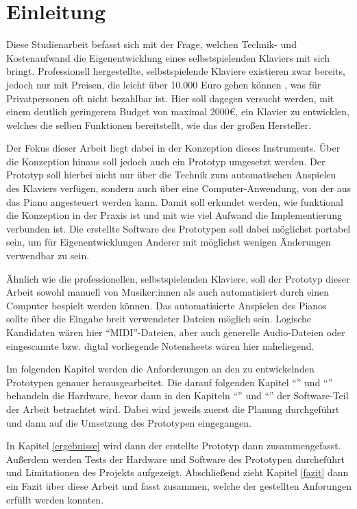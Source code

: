 
\chapter{Einleitung} \label{einleitung}

Diese Studienarbeit befasst sich mit der Frage, welchen Technik- und Kostenaufwand die Eigenentwicklung eines selbstspielenden Klaviers mit sich bringt.
Professionell hergestellte, selbstspielende Klaviere existieren zwar bereits,
jedoch nur mit Preisen, die leicht über 10.000 Euro gehen können \cite{YamahaU1}, was für Privatpersonen oft nicht bezahlbar ist.
Hier soll dagegen versucht werden, mit einem deutlich geringerem Budget von maximal 2000\euro{}, ein Klavier zu entwicklen, welches die selben Funktionen bereitstellt, wie das der großen Hersteller.


Der Fokus dieser Arbeit liegt dabei in der Konzeption dieses Instruments.
Über die Konzeption hinaus soll jedoch auch ein Prototyp umgesetzt werden.
Der Prototyp soll hierbei nicht nur über die Technik zum automatischen Anspielen des Klaviers verfügen, sondern auch über eine Computer-Anwendung, von der aus das Piano angesteuert werden kann.
Damit soll erkundet werden, wie funktional die Konzeption in der Praxis ist und mit wie viel Aufwand die Implementierung verbunden ist.
Die erstellte Software des Prototypen soll dabei möglichst portabel sein, um für Eigenentwicklungen Anderer mit möglichst wenigen Änderungen verwendbar zu sein.

Ähnlich wie die professionellen, selbstspielenden Klaviere, soll der Prototyp dieser Arbeit sowohl manuell von Musiker:innen als auch automatisiert durch einen Computer bespielt werden können.
Das automatisierte Anspielen des Pianos sollte über die Eingabe breit verwendeter Dateien möglich sein.
Logische Kandidaten wären hier \enquote{\ac{MIDI}}-Dateien, aber auch generelle Audio-Dateien oder eingescannte bzw. digtal vorliegende Notensheets wären hier naheliegend.

Im folgenden Kapitel werden die Anforderungen an den zu entwickelnden Prototypen genauer herausgearbeitet. \newline
Die darauf folgenden Kapitel \enquote{} und \enquote{} behandeln die Hardware, bevor dann in den Kapiteln \enquote{} und \enquote{} der Software-Teil der Arbeit betrachtet wird.
Dabei wird jeweils zuerst die Planung durchgeführt und dann auf die Umsetzung des Prototypen eingegangen.

In Kapitel \ref{ergebnisse} wird dann der erstellte Prototyp dann zusammengefasst.
Außerdem werden Tests der Hardware und Software des Prototypen durcheführt und Limitationen des Projekts aufgezeigt. \newline
Abschließend zieht Kapitel \ref{fazit} dann ein Fazit über diese Arbeit und fasst zusammen, welche der gestellten Anforungen erfüllt werden konnten.
